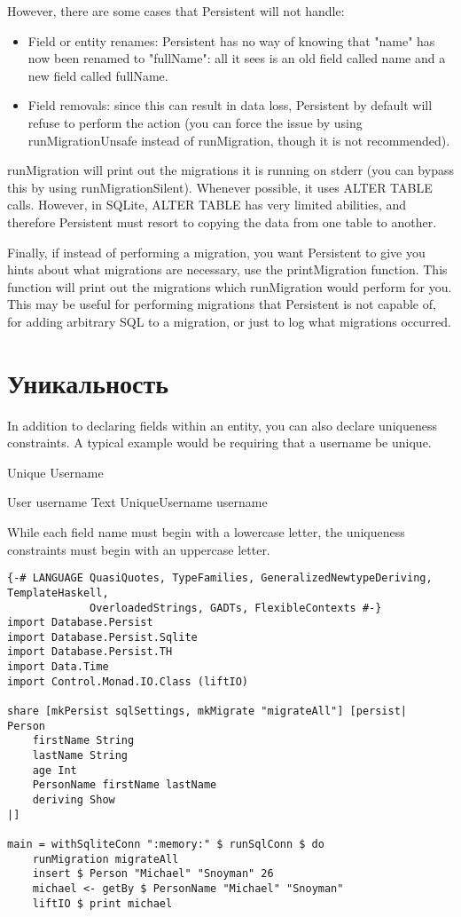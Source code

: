 However, there are some cases that Persistent will not handle:

\begin{itemize}
	\item Field or entity renames: Persistent has no way of knowing that "name" has now been renamed to "fullName": all it sees is an old field called name and a new field called fullName.
	\item Field removals: since this can result in data loss, Persistent by default will refuse to perform the action (you can force the issue by using runMigrationUnsafe instead of runMigration, though it is not recommended).
\end{itemize}

runMigration will print out the migrations it is running on stderr (you can bypass this by using runMigrationSilent). Whenever possible, it uses ALTER TABLE calls. However, in SQLite, ALTER TABLE has very limited abilities, and therefore Persistent must resort to copying the data from one table to another.

Finally, if instead of performing a migration, you want Persistent to give you hints about what migrations are necessary, use the printMigration function. This function will print out the migrations which runMigration would perform for you. This may be useful for performing migrations that Persistent is not capable of, for adding arbitrary SQL to a migration, or just to log what migrations occurred.

\section{Уникальность} %

In addition to declaring fields within an entity, you can also declare uniqueness constraints. A typical example would be requiring that a username be unique.


Unique Username

User
    username Text
    UniqueUsername username

While each field name must begin with a lowercase letter, the uniqueness constraints must begin with an uppercase letter.

\begin{lstlisting}
{-# LANGUAGE QuasiQuotes, TypeFamilies, GeneralizedNewtypeDeriving, TemplateHaskell,
             OverloadedStrings, GADTs, FlexibleContexts #-}
import Database.Persist
import Database.Persist.Sqlite
import Database.Persist.TH
import Data.Time
import Control.Monad.IO.Class (liftIO)

share [mkPersist sqlSettings, mkMigrate "migrateAll"] [persist|
Person
    firstName String
    lastName String
    age Int
    PersonName firstName lastName
    deriving Show
|]

main = withSqliteConn ":memory:" $ runSqlConn $ do
    runMigration migrateAll
    insert $ Person "Michael" "Snoyman" 26
    michael <- getBy $ PersonName "Michael" "Snoyman"
    liftIO $ print michael
\end{lstlisting}%

